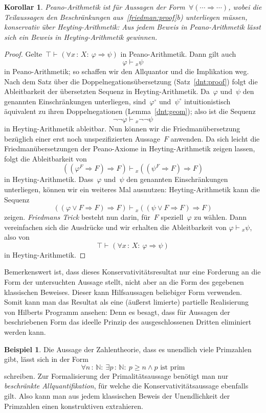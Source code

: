 \documentclass[a4paper,ngerman,12pt]{scrartcl}
\theoremstyle{definition}
\newtheorem{bsp}[defn]{Beispiel}
\theoremstyle{plain}
\newtheorem{kor}[defn]{Korollar}
\theoremstyle{remark}
\newcommand{\NN}{\mathbb{N}}
\newcommand{\seq}[1]{\mathrel{\vdash\!\!\!_{#1}}}
\renewcommand{\_}{\mathpunct{.}\,}
\newcommand{\?}{\,{:}\,}
\begin{document}
\begin{kor}Peano-Arithmetik ist für Aussagen der Form~$\forall (\cdots
\Rightarrow \cdots)$, wobei die Teilaussagen den Beschränkungen
aus~\ref{friedman:proof}b) unterliegen müssen, \emph{konservativ} über
Heyting-Arithmetik: Aus jedem Beweis in Peano-Arithmetik lässt sich ein Beweis
in Heyting-Arithmetik gewinnen.\end{kor}
\begin{proof}Gelte~$\top \seq{} (\forall x\?X{:}\ \varphi \Rightarrow \psi)$ in
Peano-Arithmetik. Dann gilt auch
\[ \varphi \seq{x} \psi \]
in Peano-Arithmetik; so schaffen wir den Allquantor und die Implikation weg.
Nach dem Satz über die Doppelnegationsübersetzung (Satz~\ref{dnt:proof}) folgt
die Ableitbarkeit der übersetzten Sequenz in Heyting-Arithmetik. Da~$\varphi$
und~$\psi$ den genannten Einschränkungen unterliegen, sind~$\varphi^\circ$
und~$\psi^\circ$ intuitionistisch äquivalent zu ihren Doppelnegationen
(Lemma~\ref{dnt:geom}); also ist die Sequenz
\[ \neg\neg\varphi \seq{x} \neg\neg\psi \]
in Heyting-Arithmetik ableitbar. Nun können wir die Friedmanübersetzung
bezüglich einer erst noch unspezifizierten Aussage~$F$ anwenden. Da sich leicht die
Friedmanübersetzungen der Peano-Axiome in Heyting-Arithmetik zeigen lassen,
folgt die Ableitbarkeit von
\[ ((\varphi^F \Rightarrow F) \Rightarrow F) \seq{x}
  ((\psi^F \Rightarrow F) \Rightarrow F) \]
in Heyting-Arithmetik. Dass~$\varphi$ und~$\psi$ den genannten Einschränkungen
unterliegen, können wir ein weiteres Mal ausnutzen: Heyting-Arithmetik kann die
Sequenz
\[ ((\varphi \vee F \Rightarrow F) \Rightarrow F) \seq{x}
  ((\psi \vee F \Rightarrow F) \Rightarrow F) \]
zeigen. \emph{Friedmans Trick} besteht nun darin, für~$F$ speziell~$\varphi$ zu
wählen. Dann vereinfachen sich die Ausdrücke und wir erhalten die Ableitbarkeit
von $\varphi \seq{x} \psi$, also von
\[ \top \seq{} (\forall x\?X{:}\ \varphi \Rightarrow \psi) \]
in Heyting-Arithmetik.
\end{proof}

Bemerkenswert ist, dass dieses Konservativitätsresultat nur eine Forderung
an die Form der untersuchten Aussage stellt, nicht aber an die Form des gegebenen
klassischen Beweises. Dieser kann Hilfsaussagen beliebiger Form verwenden.
Somit kann man das Resultat als eine (äußerst limierte) partielle Realisierung
von Hilberts Programm ansehen: Denn es besagt, dass für Aussagen der
beschriebenen Form das ideelle Prinzip des ausgeschlossenen Dritten eliminiert
werden kann.

\begin{bsp}Die Aussage der Zahlentheorie, dass es unendlich viele Primzahlen
gibt, lässt sich in der Form
\[ \forall n\?\NN{:}\ \exists p\?\NN{:}\ p \geq n \wedge \text{$p$ ist prim} \]
schreiben. Zur Formalisierung der Primalitätsaussage benötigt man nur
\emph{beschränkte Allquantifikation}, für welche die Konservativitätsaussage
ebenfalls gilt. Also kann man aus jedem klassischen Beweis der Unendlichkeit
der Primzahlen einen konstruktiven extrahieren.
\end{bsp}
\end{document}
